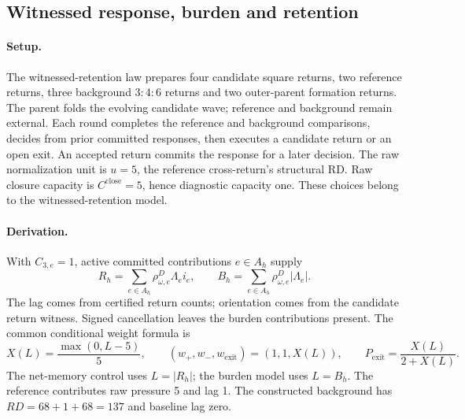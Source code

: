 
\subsection{Witnessed response, burden and retention}
\label{manual2:witnessed-retention}
\paragraph{Setup.}
The witnessed-retention law prepares four candidate square returns, two reference
returns, three background \(3{:}4{:}6\) returns and two outer-parent formation
returns. The parent folds the evolving candidate wave; reference and background
remain external. Each round completes the reference and background comparisons,
decides from prior committed responses, then executes a candidate return or an
open exit. An accepted return commits the response for a later decision.
The raw normalization unit is \(u=5\), the reference cross-return's structural
RD. Raw closure capacity is \(C^{\mathrm{close}}=5\), hence diagnostic capacity
one. These choices belong to the witnessed-retention model.

\paragraph{Derivation.}
With \(C_{3,e}=1\), active committed contributions \(e\in A_h\) supply
\begin{equation}
R_h=\sum_{e\in A_h}\rho^D_{\omega,e}\Lambda_e i_e,
\qquad
B_h=\sum_{e\in A_h}\rho^D_{\omega,e}|\Lambda_e|.
\label{eq:manual2-witnessed-response-burden}
\end{equation}
The lag comes from certified return counts; orientation comes from the candidate
return witness. Signed cancellation leaves the burden contributions present.
The common conditional weight formula is
\begin{equation}
X(L)=\frac{\max(0,L-5)}5,\qquad
(w_+,w_-,w_{\mathrm{exit}})=(1,1,X(L)),\qquad
P_{\mathrm{exit}}=\frac{X(L)}{2+X(L)}.
\label{eq:manual2-witnessed-retention-kernel}
\end{equation}
The net-memory control uses \(L=|R_h|\); the burden model uses \(L=B_h\).
The reference contributes raw pressure 5 and lag 1. The constructed background
has \(RD=68+1+68=137\) and baseline lag zero.

